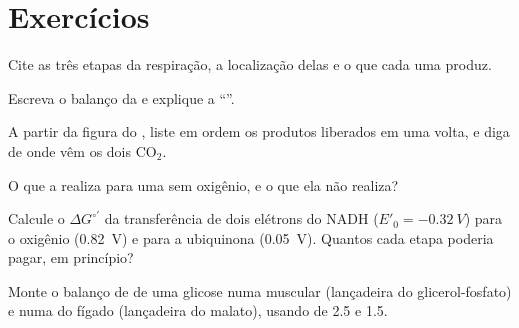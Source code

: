 \section{Exercícios}

\begin{exercise}[$\star$]\label{exo:b1:respiration-fermentation:1}
Cite as três etapas da respiração, a localização delas e o que cada uma
produz.
\end{exercise}

\begin{exercise}[$\star$]\label{exo:b1:respiration-fermentation:2}
Escreva o balanço da  e explique a ``''.
\end{exercise}

\begin{exercise}[$\star$]\label{exo:b1:respiration-fermentation:3}
A partir da figura do , liste em ordem os produtos
liberados em uma volta, e diga de onde vêm os dois $\mathrm{CO_2}$.
\end{exercise}

\begin{exercise}[$\star$]\label{exo:b1:respiration-fermentation:4}
O que a  realiza para uma  sem oxigênio, e o que ela
não realiza?
\end{exercise}

\begin{exercise}[$\star\star$]\label{exo:b1:respiration-fermentation:5}
Calcule o $\Delta G^{\circ\prime}$ da transferência de dois elétrons do
NADH ($E'_0 = \qty{-0.32}{V}$) para o oxigênio (\qty{+0.82}{V}) e para
a ubiquinona (\qty{+0.05}{V}). Quantos  cada etapa poderia pagar, em
princípio?
\end{exercise}

\begin{exercise}[$\star\star$]\label{exo:b1:respiration-fermentation:6}
Monte o balanço de  de uma glicose numa  muscular (lançadeira
do glicerol-fosfato) e numa  do fígado (lançadeira do malato),
usando  de 2.5 e 1.5.
\end{exercise}

